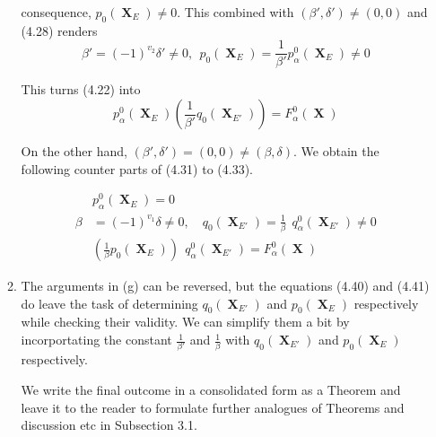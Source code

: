 \documentclass[a4paper,12pt]{article}
\DeclareMathOperator{\x}{\mathrm{X}}
\theoremstyle{definition}
\theoremstyle{underlinethm}
\theoremstyle{definition}
\begin{document}
\begin{enumerate}[label=(\alph*)]
\begin{enumerate}[label=(\alph*)]
consequence, $p_{0}(\boldsymbol{\x}_{E}) \neq  0$. This combined with $(\beta', \delta') \neq (0,0)$ and (4.28) renders 
\begin{equation}
\beta'=(-1)^{v_{2}} \delta' \neq 0, ~~p_{0}(\boldsymbol{\x}_{E}) = \frac{1}{\beta'} p_{\alpha}^{0}(\boldsymbol{\x}_{E}) \neq 0\tag{4.39}\label{eq-4.39}
\end{equation} 

This turns (4.22) into
\begin{equation}
p_{\alpha}^{0} (\boldsymbol{\x}_{E}) \left(\frac{1}{\beta'} q_{0} (\boldsymbol{\x}_{E'}) \right) = F_{\alpha}^{0}(\boldsymbol{\x})\tag{4.40}\label{eq-4.40}
\end{equation}

On the other hand, $(\beta', \delta') = (0,0) \neq (\beta, \delta)$. We obtain the following counter parts of (4.31) to (4.33).

\begin{align*}
&p_{\alpha}^{0} (\boldsymbol{\x}_{E}) = 0\tag{4.41}\label{eq-4.41}\\
\beta &= (-1)^{v_{1}} \delta \neq 0, \quad q_{0}(\boldsymbol{\x}_{E'}) = \frac{1}{\beta} ~~q_{\alpha}^{0} (\boldsymbol{\x}_{E'}) \neq 0\tag{4.42}\label{eq-4.42}\\
&\left(\frac{1}{\beta} p_{0}(\boldsymbol{\x}_{E}) \right)~~q_{\alpha}^{0} (\boldsymbol{\x}_{E'}) = F_{\alpha}^{0}(\boldsymbol{\x})\tag{4.43}\label{eq-4.43}
\end{align*} 

\item The arguments in (g) can be reversed, but the equations (4.40) and (4.41) do leave the task of determining $q_{0}(\boldsymbol{\x}_{E'})$ and $p_{0}(\boldsymbol{\x}_{E})$  respectively while checking their validity. We can simplify them a bit by incorportating the constant $\frac{1}{\beta'}$ and $\frac{1}{\beta}$ with $q_{0}(\boldsymbol{\x}_{E'})$ and $p_{0}(\boldsymbol{\x}_{E})$ respectively.

We write the final outcome in a consolidated form as a Theorem and leave it to the reader to formulate further analogues of Theorems and discussion etc in Subsection 3.1.
\end{enumerate}
\end{enumerate}
\end{document}
